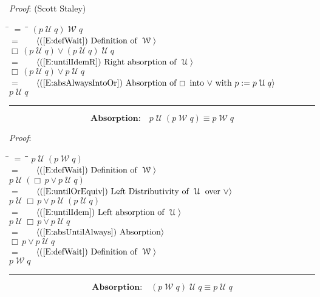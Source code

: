 \documentclass[12pt, fleqn, leqno]{article}
\newcommand{\lgap}{2pt}                             %
\newcommand{\mymathindent}{24pt}                    %
\newcommand{\Until}{\;\mathcal{U}\;}
\newcommand{\Wait}{\;\mathcal{W}\;}
\newcommand{\Always}{\Box\,}
\newcommand{\myqed}{\rule[-.23ex]{1.2ex}{2.0ex}}
\newcommand{\myqedtab}{\hspace{384pt}}              %
\newcommand{\Gll} {\langle}                         %
\newcommand{\Ggg} {\rangle}                         %
\newcommand{\Hint}[1]     {\ \ \ $\Gll              \mbox{#1} \Ggg$ }   %
\begin{document}
\emph{Proof}: (Scott Staley)
\begin{tabbing}
\hspace{\mymathindent} \= $= \;$ \= \myqedtab \= \kill
\> \> $(p \Until q) \Wait q$\\[\lgap]
\> $=$ \> \Hint{(\ref{E:defWait}) Definition of $\Wait$} \\[\lgap]
\> \> $\Always (p \Until q)\lor (p \Until q) \Until q$\\[\lgap]
\> $=$ \> \Hint{(\ref{E:untilIdemR}) Right absorption of $\Until$} \\[\lgap]
\> \> $\Always (p \Until q)\lor p \Until q$\\[\lgap]
\> $=$ \> \Hint{(\ref{E:absAlwaysIntoOr}) Absorption of $\Always$ into $\lor$ with $p := p\Until q$} \\[\lgap]
\> \> $p \Until q$ \quad \myqed
\end{tabbing}
\begin{equation}\label{E:leftUntilAbsWait}
\textbf{Absorption:}\quad p \Until (p \Wait q) \equiv p \Wait q
\end{equation}

\emph{Proof}:
\begin{tabbing}
\hspace{\mymathindent} \= $= \;$ \= \myqedtab \= \kill
\> \> $p \Until (p \Wait q)$\\[\lgap]
\> $=$ \> \Hint{(\ref{E:defWait}) Definition of $\Wait$} \\[\lgap]
\> \> $p \Until (\Always p\lor p \Until q)$\\[\lgap]
\> $=$ \> \Hint{(\ref{E:untilOrEquiv}) Left Distributivity of $\Until$ over $\lor$} \\[\lgap]
\> \> $p \Until \Always p\lor p \Until (p \Until q)$\\[\lgap]
\> $=$ \> \Hint{(\ref{E:untilIdem}) Left absorption of $\Until$} \\[\lgap]
\> \> $p \Until \Always p\lor p \Until q$\\[\lgap]
\> $=$ \> \Hint{(\ref{E:absUntilAlways}) Absorption} \\[\lgap]
\> \> $\Always p\lor p \Until q$\\[\lgap]
\> $=$ \> \Hint{(\ref{E:defWait}) Definition of $\Wait$} \\[\lgap]
\> \> $p \Wait q$ \quad \myqed
\end{tabbing}
\begin{equation}\label{E:rightUntilAbsWait}
\textbf{Absorption:}\quad (p \Wait q) \Until q \equiv p \Until q
\end{equation}
\end{document}
